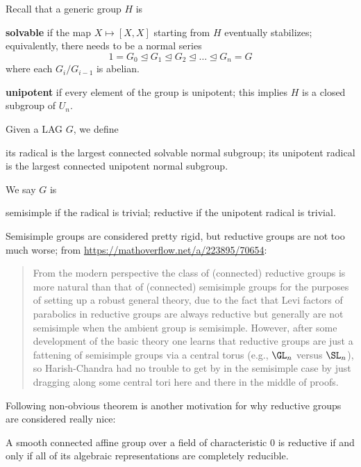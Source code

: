 Recall that a generic group $H$ is
\begin{itemize}
  \ii \textbf{solvable} if the map $X \mapsto [X,X]$ starting from $H$
  eventually stabilizes; equivalently, there needs to be a normal series
  \[ 1 = G_0 \trianglelefteq G_1 \trianglelefteq G_2 \trianglelefteq
    \dots \trianglelefteq G_n = G \]
  where each $G_i / G_{i-1}$ is abelian.

  \ii \textbf{unipotent} if every element of the group is unipotent;
  this implies $H$ is a closed subgroup of $U_n$.
\end{itemize}

\begin{definition}
  Given a LAG $G$, we define
  \begin{itemize}
    \ii its \alert{radical} is the largest connected solvable normal subgroup;
    \ii its \alert{unipotent radical}
    is the largest connected unipotent normal subgroup.
  \end{itemize}
  We say $G$ is
  \begin{itemize}
    \ii \alert{semisimple} if the radical is trivial;
    \ii \alert{reductive} if the unipotent radical is trivial.
  \end{itemize}
\end{definition}

Semisimple groups are considered pretty rigid,
but reductive groups are not too much worse;
from \url{https://mathoverflow.net/a/223895/70654}:
\begin{quote}
From the modern perspective the class of (connected) reductive groups is more
natural than that of (connected) semisimple groups for the purposes of setting
up a robust general theory, due to the fact that Levi factors of parabolics in
reductive groups are always reductive but generally are not semisimple when the
ambient group is semisimple. However, after some development of the basic theory
one learns that reductive groups are just a fattening of semisimple groups via a
central torus (e.g., $\GL_n$ versus $\SL_n$), so Harish-Chandra had no trouble to get by
in the semisimple case by just dragging along some central tori here and there
in the middle of proofs.
\end{quote}

Following non-obvious theorem is another motivation for why reductive
groups are considered really nice:
\begin{theorem}
  A smooth connected affine group over a field of characteristic $0$
  is reductive if and only if all of its algebraic representations
  are completely reducible.
\end{theorem}

